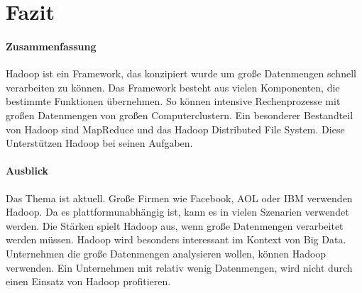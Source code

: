 \newpage
\section{Fazit}
\paragraph{Zusammenfassung}$\;$ \\
Hadoop ist ein Framework, das konzipiert wurde um große Datenmengen schnell verarbeiten zu können. Das Framework besteht aus vielen Komponenten, die bestimmte Funktionen übernehmen. So können intensive Rechenprozesse mit großen Datenmengen von großen Computerclustern. Ein besonderer Bestandteil von Hadoop sind MapReduce und das Hadoop Distributed File System. Diese Unterstützen Hadoop bei seinen Aufgaben.
\paragraph{Ausblick}$\;$ \\
Das Thema ist aktuell. Große Firmen wie Facebook, AOL oder IBM verwenden Hadoop. Da es plattformunabhängig ist, kann es in vielen Szenarien verwendet werden. Die Stärken spielt Hadoop aus, wenn große Datenmengen verarbeitet werden müssen. Hadoop wird besonders interessant im Kontext von Big Data. Unternehmen  die große Datenmengen analysieren wollen, können Hadoop verwenden. Ein Unternehmen mit relativ wenig Datenmengen, wird nicht durch einen Einsatz von Hadoop profitieren.  